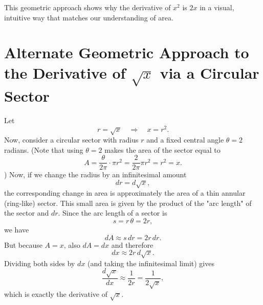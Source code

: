 \documentclass{article}
\begin{document}
This geometric approach shows why the derivative of $x^2$ is $2x$ in a visual, intuitive way that matches our understanding of area.

\section*{Alternate Geometric Approach to the Derivative of \(\sqrt{x}\) via a Circular Sector}

Let 
\[
r=\sqrt{x} \quad\Longrightarrow\quad x=r^2.
\]
Now, consider a circular sector with radius \(r\) and a fixed central angle \(\theta = 2\) radians. (Note that using \(\theta=2\) makes the area of the sector equal to
\[
A=\frac{\theta}{2\pi}\cdot\pi r^2=\frac{2}{2\pi}\pi r^2=r^2=x.
\]
) Now, if we change the radius by an infinitesimal amount 
\[
dr=d\sqrt{x},
\]
the corresponding change in area is approximately the area of a thin annular (ring‐like) sector. This small area is given by the product of the "arc length" of the sector and \(dr\). Since the arc length of a sector is
\[
s=r\,\theta=2r,
\]
we have
\[
dA\approx s\,dr=2r\,dr.
\]
But because \(A=x\), also \(dA=dx\) and therefore
\[
dx\approx 2r\,d\sqrt{x}.
\]
Dividing both sides by \(dx\) (and taking the infinitesimal limit) gives
\[
\frac{d\sqrt{x}}{dx} \approx \frac{1}{2r}=\frac{1}{2\sqrt{x}},
\]
which is exactly the derivative of \(\sqrt{x}\).

\vspace{-0.5cm}

\begin{center}
\end{center}
\end{document}
